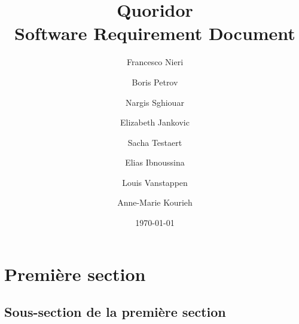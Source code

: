 \documentclass[11pt,a4paper,titlepage]{article}
\title{{\Huge Quoridor\\ }Software Requirement Document}
\author{Francesco Nieri \and Boris Petrov \and Nargis Sghiouar \and Elizabeth Jankovic \and Sacha Testaert \and Elias Ibnoussina \and Louis Vanstappen \and Anne-Marie Kourieh}
\date{\today}
\begin{document}
\maketitle
\tableofcontents


\section{Première section}

\subsection{Sous-section de la première section}
\end{document}
